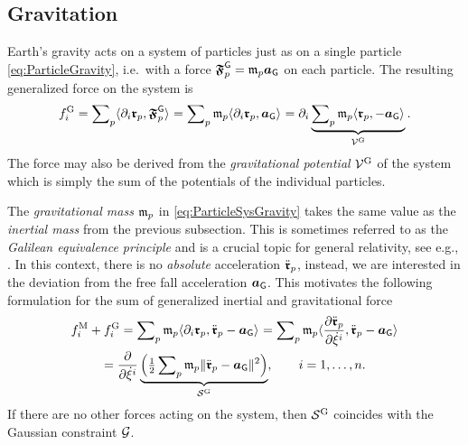 \subsection{Gravitation}\label{sec:ParticleSysGravitation}
Earth's gravity acts on a system of particles just as on a single particle \eqref{eq:ParticleGravity}, i.e.\ with a force $\particleForceGravity{\PidxI} = \particleMass{\PidxI} \gravityAcc$ on each particle.
The resulting generalized force on the system is
\begin{align}
 \genForceGravityCoeff{\LidxI}
 = \sumParticles \sProd{\dirDiff{\LidxI} \particlePos{\PidxI}}{\particleForceGravity{\PidxI}}
 = \sumParticles \particleMass{\PidxI} \sProd{\dirDiff{\LidxI}\particlePos{\PidxI}}{\gravityAcc}
 = \dirDiff{\LidxI} \underbrace{\sumParticles \particleMass{\PidxI} \sProd{\particlePos{\PidxI}}{-\gravityAcc}}_{\potentialGravity}.
\label{eq:ParticleSysGravity}
\end{align}
The force may also be derived from the \textit{gravitational potential} $\potentialGravity$ of the system which is simply the sum of the potentials of the individual particles.

The \textit{gravitational mass} $\particleMass{\PidxI}$ in \eqref{eq:ParticleSysGravity} takes the same value as the \textit{inertial mass} from the previous subsection.
This is sometimes referred to as the \textit{Galilean equivalence principle} and is a crucial topic for general relativity, see e.g., \cite[chap.\,16]{Misner:Gravitation}.
In this context, there is no \textit{absolute} acceleration $\particlePosdd{\PidxI}$, instead, we are interested in the deviation from the free fall acceleration $\gravityAcc$.
This motivates the following formulation for the sum of generalized inertial and gravitational force
\begin{multline}
  \genForceInertiaCoeff{\LidxI} + \genForceGravityCoeff{\LidxI} 
  = \sumParticles \particleMass{\PidxI} \sProd{\dirDiff{\LidxI} \particlePos{\PidxI}}{\particlePosdd{\PidxI} - \gravityAcc}
  = \sumParticles \particleMass{\PidxI} \sProd{\pdiff[\particlePosdd{\PidxI}]{\sysVelCoeffd{\LidxI}}}{\particlePosdd{\PidxI} - \gravityAcc}
\\
  = \pdiff{\sysVelCoeffd{\LidxI}} \underbrace{\Big(\tfrac{1}{2} \sumParticles \particleMass{\PidxI} \norm{\particlePosdd{\PidxI} - \gravityAcc}^2\Big)}_{\accEnergyInertial},
  \qquad
  \LidxI = 1,\ldots,\dimConfigSpace.
 \label{eq:EinsteinianForce}
\end{multline}
If there are no other forces acting on the system, then $\accEnergyInertial$ coincides with the Gaussian constraint $\GaussianConstraint$.

